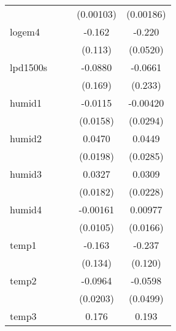{\begin{tabular}{l*{4}{c}}
            &                     &                     &   (0.00103)         &   (0.00186)         \\
[1em]
logem4      &                     &                     &      -0.162         &      -0.220\sym{**} \\
            &                     &                     &     (0.113)         &    (0.0520)         \\
[1em]
lpd1500s    &                     &                     &     -0.0880         &     -0.0661         \\
            &                     &                     &     (0.169)         &     (0.233)         \\
[1em]
humid1      &                     &                     &     -0.0115         &    -0.00420         \\
            &                     &                     &    (0.0158)         &    (0.0294)         \\
[1em]
humid2      &                     &                     &      0.0470\sym{*}  &      0.0449         \\
            &                     &                     &    (0.0198)         &    (0.0285)         \\
[1em]
humid3      &                     &                     &      0.0327         &      0.0309         \\
            &                     &                     &    (0.0182)         &    (0.0228)         \\
[1em]
humid4      &                     &                     &    -0.00161         &     0.00977         \\
            &                     &                     &    (0.0105)         &    (0.0166)         \\
[1em]
temp1       &                     &                     &      -0.163         &      -0.237         \\
            &                     &                     &     (0.134)         &     (0.120)         \\
[1em]
temp2       &                     &                     &     -0.0964\sym{***}&     -0.0598         \\
            &                     &                     &    (0.0203)         &    (0.0499)         \\
[1em]
temp3       &                     &                     &       0.176\sym{*}  &       0.193\sym{***}\\

\end{tabular}}
